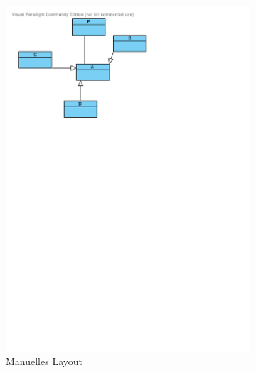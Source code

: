 \begin{figure}[hbt]
    \newcommand{\leftsubfigurewidth}{0.4\textwidth}
    \newcommand{\rightsubfigurewidth}{0.59\textwidth}
    \newcommand{\graphicsscale}{0.58}
    \centering
    \begin{subfigure}{\leftsubfigurewidth}
        \centering
        \includegraphics[scale=\graphicsscale]{assets/visual-paradigm-auto-layout-a}
        \caption{Manuelles Layout}
        \label{fig:visual-paradigm-auto-layout-a}
    \end{subfigure}
    \begin{subfigure}{\rightsubfigurewidth}
        \centering

\end{subfigure}
\end{figure}

